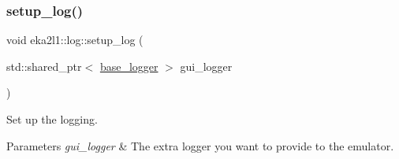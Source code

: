 \subsubsection{\texorpdfstring{setup\+\_\+log()}{setup\_log()}}
{\footnotesize\ttfamily void eka2l1\+::log\+::setup\+\_\+log (\begin{DoxyParamCaption}\item[{std\+::shared\+\_\+ptr$<$ \mbox{\hyperlink{classeka2l1_1_1base__logger}{base\+\_\+logger}} $>$}]{gui\+\_\+logger }\end{DoxyParamCaption})}



Set up the logging. 


\begin{DoxyParams}{Parameters}
{\em gui\+\_\+logger} & The extra logger you want to provide to the emulator. \\
\hline
\end{DoxyParams}
